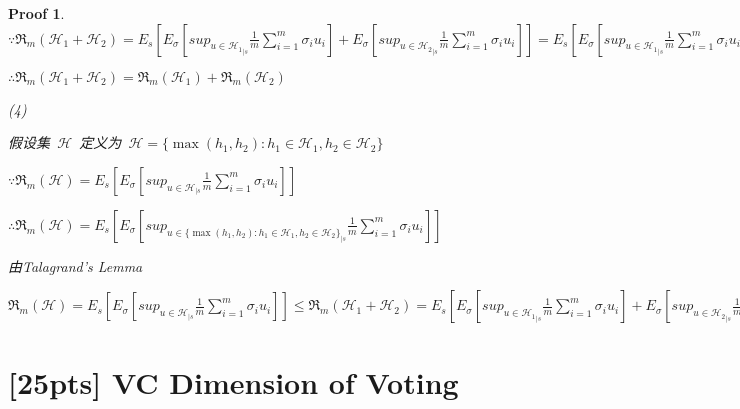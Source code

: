 \documentclass[a4paper,UTF8]{article}
\numberwithin{equation}{section}
\newtheorem*{myProof}{Proof}
\begin{document}
\begin{myProof}
    $\because \mathfrak{R}_m\left ( \mathcal{ H}_1+\mathcal{ H}_2 \right ) = E_s\left [ E_\sigma \left [ sup_{u\in {\mathcal{ H}_1}_{|s}}\frac{1}{m}\sum_{i=1}^{m} \sigma _iu_i\right ]+E_\sigma \left [ sup_{u\in {\mathcal{ H}_2}_{|s}}\frac{1}{m}\sum_{i=1}^{m} \sigma _iu_i\right ] \right ] = E_s\left [ E_\sigma \left [ sup_{u\in {\mathcal{ H}_1}_{|s}}\frac{1}{m}\sum_{i=1}^{m} \sigma _iu_i\right ]\right]+E_s\left [ E_\sigma \left [ sup_{u\in {\mathcal{ H}_2}_{|s}}\frac{1}{m}\sum_{i=1}^{m} \sigma _iu_i\right ]\right]$
    
    $\therefore \mathfrak{R}_m(\mathcal{H}_1 + \mathcal{H}_2) = \mathfrak{R}_m(\mathcal{H}_1) + \mathfrak{R}_m(\mathcal{H}_2)$
    
    (4)
    
    假设集~$\mathcal{H}$~定义为~$\mathcal{H} = \{\max(h_1,h_2): h_1\in \mathcal{H}_1, h_2\in \mathcal{H}_2\}$
    
    $\because \mathfrak{R}_m\left ( \mathcal{ H} \right ) = E_s\left [ E_\sigma \left [ sup_{u\in {\mathcal{ H}}_{|s}}\frac{1}{m}\sum_{i=1}^{m} \sigma _iu_i\right ] \right ]$
    
    $\therefore \mathfrak{R}_m\left ( \mathcal{ H} \right ) = E_s\left [ E_\sigma \left [ sup_{u\in { \{\max(h_1,h_2): h_1\in \mathcal{H}_1, h_2\in \mathcal{H}_2\}}_{|s}} \frac{1}{m}\sum_{i=1}^{m} \sigma _iu_i\right ] \right ]$
    
    由Talagrand's Lemma
    
    $\mathfrak{R}_m\left ( \mathcal{ H} \right ) = E_s\left [ E_\sigma \left [ sup_{u\in {\mathcal{ H}}_{|s}}\frac{1}{m}\sum_{i=1}^{m} \sigma _iu_i\right ] \right ]\leq \mathfrak{R}_m\left ( \mathcal{ H}_1+\mathcal{ H}_2 \right ) = E_s\left [ E_\sigma \left [ sup_{u\in {\mathcal{ H}_1}_{|s}}\frac{1}{m}\sum_{i=1}^{m} \sigma _iu_i\right ]+E_\sigma \left [ sup_{u\in {\mathcal{ H}_2}_{|s}}\frac{1}{m}\sum_{i=1}^{m} \sigma _iu_i\right ] \right ] = E_s\left [ E_\sigma \left [ sup_{u\in {\mathcal{ H}_1}_{|s}}\frac{1}{m}\sum_{i=1}^{m} \sigma _iu_i\right ]\right]+E_s\left [ E_\sigma \left [ sup_{u\in {\mathcal{ H}_2}_{|s}}\frac{1}{m}\sum_{i=1}^{m} \sigma _iu_i\right ]\right]$
    
    
    
    
    
    
    
    
    
    
\end{myProof}

\newpage 

\section{[25pts] VC Dimension of Voting}
\end{document}
